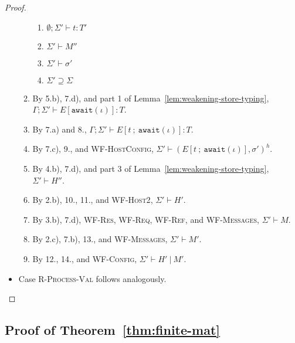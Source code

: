 \begin{proof}
\begin{itemize}
\begin{enumerate}
\begin{enumerate}[label=(\alph*)]
  \item $\emptyset ; \Sigma' \vdash t : T'$
  \item $\Sigma' \vdash M''$
  \item $\Sigma' \vdash \sigma'$
  \item $\Sigma' \supseteq \Sigma$
  \end{enumerate}
\item By 5.b), 7.d), and part 1 of Lemma~\ref{lem:weakening-store-typing}, $\Gamma ; \Sigma' \vdash E[\texttt{await}(\iota)] : T$.
\item By 7.a) and 8., $\Gamma ; \Sigma' \vdash E[t~;~\texttt{await}(\iota)] : T$.
\item By 7.c), 9., and \textsc{WF-HostConfig}, $\Sigma' \vdash (E[t~;~\texttt{await}(\iota)], \sigma')^h$.
\item By 4.b), 7.d), and part 3 of Lemma~\ref{lem:weakening-store-typing}, $\Sigma' \vdash H''$.
\item By 2.b), 10., 11., and \textsc{WF-Host2}, $\Sigma' \vdash H'$.
\item By 3.b), 7.d), \textsc{WF-Res}, \textsc{WF-Req}, \textsc{WF-Ref}, and \textsc{WF-Messages}, $\Sigma' \vdash M$.
\item By 2.c), 7.b), 13., and \textsc{WF-Messages}, $\Sigma' \vdash M'$.
\item By 12., 14., and \textsc{WF-Config}, $\Sigma' \vdash H'~|~M'$.
\end{enumerate}

\item Case \textsc{R-Process-Val} follows analogously.

\end{itemize}

\end{proof}

\subsection{Proof of Theorem~\ref{thm:finite-mat}}\label{app:finite-mat}

